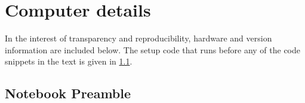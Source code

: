 \documentclass[../thesis.tex]{subfiles}
\begin{document}
\chapter{Computer details}\label{ch:computer-details}

In the interest of transparency and reproducibility, hardware and version
information are included below. The setup code that runs before any of the code
snippets in the text is given in \cref{sec:notebook-preamble}.


\section{Notebook Preamble}\label{sec:notebook-preamble}

\inputminted{julia}{notebooks/notebook_preamble.jl}
\end{document}

